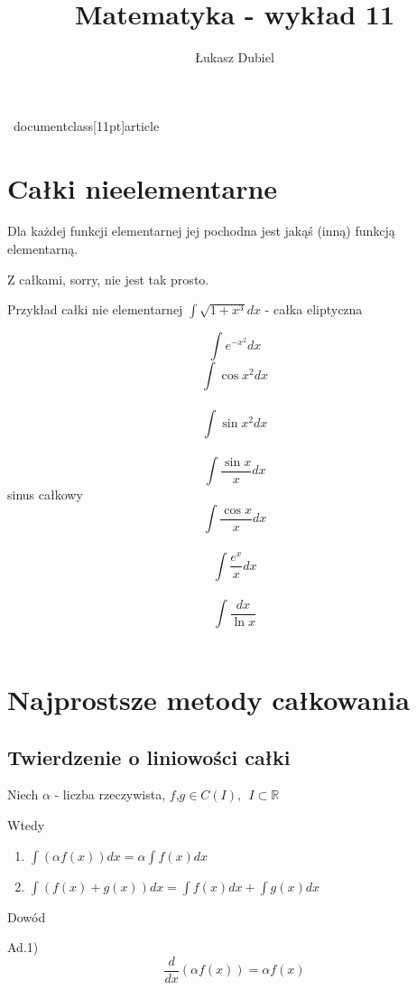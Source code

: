 \
documentclass[11pt]{article}
\usepackage[utf8]{inputenc}
\usepackage{amssymb}
\usepackage{amsmath}
\usepackage{enumerate}
\usepackage{fullpage}
\usepackage{polski}  
\usepackage{indentfirst} 
\usepackage[pdftex]{graphicx}
\usepackage{multirow}
\usepackage{placeins}

\author{Łukasz Dubiel}
\title{Matematyka - wykład 11}


\maketitle

\section{Całki nieelementarne}
Dla każdej funkcji elementarnej jej pochodna jest jakąś (inną) funkcją elementarną.

Z całkami, sorry, nie jest tak prosto.

\bigskip
Przykład całki nie elementarnej
$\int\sqrt{1+x^3}dx$ - całka eliptyczna

$$\int e^{-x^2}dx$$
$$\int \cos{x^2}dx$$ \\
$$\int \sin{x^2}dx$$ \\
$$\int \frac{\sin{x}}{x}dx$$ sinus całkowy \\
$$\int \frac{\cos{x}}{x}dx$$  \\
$$\int \frac{e^x}{x}dx$$ \\
$$\int \frac{dx}{\ln{x}}$$ \\

\section{Najprostsze metody całkowania}

\subsection{Twierdzenie o liniowości całki}
Niech $\alpha$ - liczba rzeczywista, $f$,$g \in C(I), \ \ I \subset \mathbb{R}$

Wtedy
\begin{enumerate}
\item{$\int (\alpha f(x))dx = \alpha \int f(x) dx$}
\item{$\int(f(x) + g(x))dx = \int f(x) dx + \int g(x)dx$}
\end{enumerate}
Dowód 

Ad.1) $$\frac{d}{dx}(\alpha f(x)) = \alpha f(x)$$


